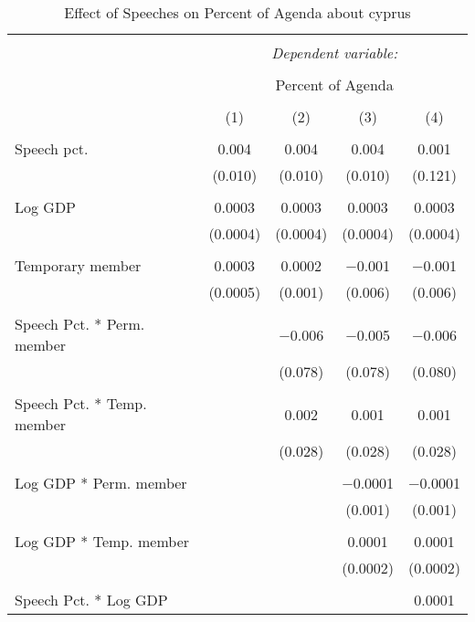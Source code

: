 
\begin{table}[!htbp] \centering 
  \caption{Effect of Speeches on Percent of Agenda about  cyprus} 
  \label{} 
\begin{tabular}{@{\extracolsep{5pt}}lcccc} 
\\[-1.8ex]\hline 
\hline \\[-1.8ex] 
 & \multicolumn{4}{c}{\textit{Dependent variable:}} \\ 
\cline{2-5} 
\\[-1.8ex] & \multicolumn{4}{c}{Percent of Agenda} \\ 
\\[-1.8ex] & (1) & (2) & (3) & (4)\\ 
\hline \\[-1.8ex] 
 Speech pct. & 0.004 & 0.004 & 0.004 & 0.001 \\ 
  & (0.010) & (0.010) & (0.010) & (0.121) \\ 
  & & & & \\ 
 Log GDP & 0.0003 & 0.0003 & 0.0003 & 0.0003 \\ 
  & (0.0004) & (0.0004) & (0.0004) & (0.0004) \\ 
  & & & & \\ 
 Temporary member & 0.0003 & 0.0002 & $-$0.001 & $-$0.001 \\ 
  & (0.0005) & (0.001) & (0.006) & (0.006) \\ 
  & & & & \\ 
 Speech Pct. * Perm. member &  & $-$0.006 & $-$0.005 & $-$0.006 \\ 
  &  & (0.078) & (0.078) & (0.080) \\ 
  & & & & \\ 
 Speech Pct. * Temp. member &  & 0.002 & 0.001 & 0.001 \\ 
  &  & (0.028) & (0.028) & (0.028) \\ 
  & & & & \\ 
 Log GDP * Perm. member &  &  & $-$0.0001 & $-$0.0001 \\ 
  &  &  & (0.001) & (0.001) \\ 
  & & & & \\ 
 Log GDP * Temp. member &  &  & 0.0001 & 0.0001 \\ 
  &  &  & (0.0002) & (0.0002) \\ 
  & & & & \\ 
 Speech Pct. * Log GDP &  &  &  & 0.0001 \\ 

\end{tabular}
\end{table}
